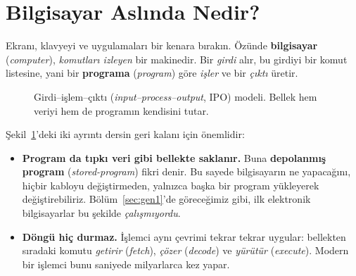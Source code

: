 \documentclass[11pt,a4paper]{article}
\newcommand{\term}[1]{\textbf{\color{mintdeep}#1}}
\begin{document}
\setcounter{tocdepth}{2}
\tableofcontents

\section{Bilgisayar Aslında Nedir?}

Ekranı, klavyeyi ve uygulamaları bir kenara bırakın. Özünde \term{bilgisayar} (\emph{computer}), \emph{komutları izleyen} bir makinedir. Bir \emph{girdi} alır, bu girdiyi bir komut listesine, yani bir \term{programa} (\emph{program}) göre \emph{işler} ve bir \emph{çıktı} üretir.

\begin{figure}[H]
\centering
{}
\caption{Girdi--işlem--çıktı (\emph{input--process--output}, IPO) modeli. Bellek hem veriyi hem de programın kendisini tutar.}
\label{fig:ipo}
\end{figure}

Şekil~\ref{fig:ipo}'deki iki ayrıntı dersin geri kalanı için önemlidir:

\begin{itemize}
  \item \textbf{Program da tıpkı veri gibi bellekte saklanır.} Buna \term{depolanmış program} (\emph{stored-program}) fikri denir. Bu sayede bilgisayarın ne yapacağını, hiçbir kabloyu değiştirmeden, yalnızca başka bir program yükleyerek değiştirebiliriz. Bölüm~\ref{sec:gen1}'de göreceğimiz gibi, ilk elektronik bilgisayarlar bu şekilde \emph{çalışmıyordu}.
  \item \textbf{Döngü hiç durmaz.} İşlemci aynı çevrimi tekrar tekrar uygular: bellekten sıradaki komutu \emph{getirir} (\emph{fetch}), \emph{çözer} (\emph{decode}) ve \emph{yürütür} (\emph{execute}). Modern bir işlemci bunu saniyede milyarlarca kez yapar.
\end{itemize}
\end{document}
